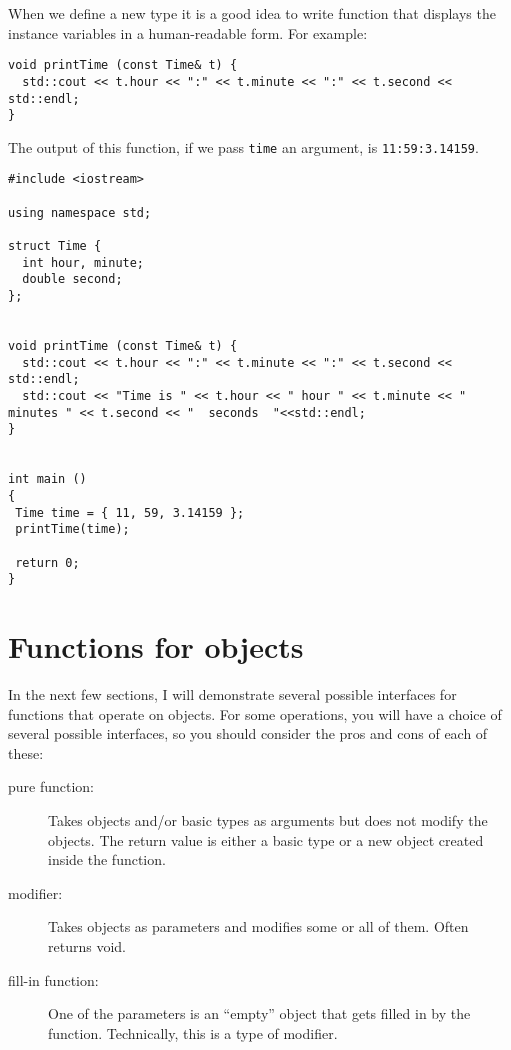 When we define a new type it is a good idea to write
function that displays the instance variables in a human-readable
form.  For example:

\begin{verbatim}
void printTime (const Time& t) {
  std::cout << t.hour << ":" << t.minute << ":" << t.second << std::endl;
}
\end{verbatim}
%
The output of this function, if we pass {\tt time}
an argument, is {\tt 11:59:3.14159}.

\begin{verbatim}
#include <iostream>

using namespace std;

struct Time {
  int hour, minute;
  double second;
};


void printTime (const Time& t) {
  std::cout << t.hour << ":" << t.minute << ":" << t.second << std::endl;
  std::cout << "Time is " << t.hour << " hour " << t.minute << " minutes " << t.second << "  seconds  "<<std::endl;
}


int main ()
{
 Time time = { 11, 59, 3.14159 };
 printTime(time);
 
 return 0;
}
\end{verbatim}
%

\section{Functions for objects}
\label{objectops}

In the next few
sections, I will demonstrate several possible interfaces for
functions that operate on objects.  For some operations, you will have a
choice of several possible interfaces, so you should consider the pros
and cons of each of these:

\begin{description}

\item[pure function:]  Takes objects and/or basic types as
arguments but does not modify the objects.  The return value is
either a basic type or a new object created inside the function.

\item[modifier:]  Takes objects as parameters and modifies some
or all of them.  Often returns void. 

\item[fill-in function:]  One of the parameters is an ``empty''
object that gets filled in by the function.  Technically, this is
a type of modifier.

\end{description}

